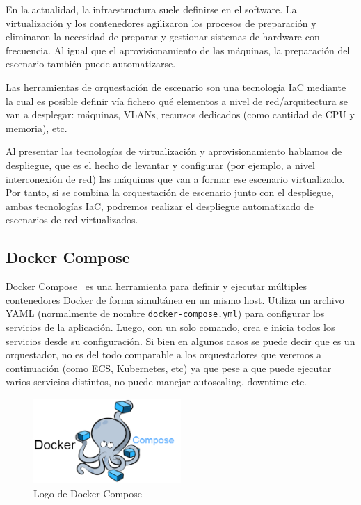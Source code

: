	En la actualidad, la infraestructura suele definirse en el software. La virtualización y los contenedores agilizaron los procesos de preparación y eliminaron la necesidad de preparar y gestionar sistemas de hardware con frecuencia. Al igual que el aprovisionamiento de las máquinas, la preparación del escenario también puede automatizarse.

	Las herramientas de orquestación de escenario son una tecnología IaC mediante la cual es posible definir vía fichero qué elementos a nivel de red/arquitectura se van a desplegar: máquinas, VLANs, recursos dedicados (como cantidad de CPU y memoria), etc. 

	Al presentar las tecnologías de virtualización y aprovisionamiento hablamos de despliegue, que es el hecho de levantar y configurar (por ejemplo, a nivel interconexión de red) las máquinas que van a formar ese escenario virtualizado. Por tanto, si se combina la orquestación de escenario junto con el despliegue, ambas tecnologías IaC, podremos realizar el despliegue automatizado de escenarios de red virtualizados.

\subsection{Docker Compose}
	Docker Compose~\cite{orq2} es una herramienta para definir y ejecutar múltiples contenedores Docker de forma simultánea en un mismo host. Utiliza un archivo YAML (normalmente de nombre \texttt{docker-compose.yml}) para configurar los servicios de la aplicación. Luego, con un solo comando, crea e inicia todos los servicios desde su configuración. Si bien en algunos casos se puede decir que es un orquestador, no es del todo comparable a los orquestadores que veremos a continuación (como ECS, Kubernetes, etc) ya que pese a que puede ejecutar varios servicios distintos, no puede manejar autoscaling, downtime etc.

	\begin{figure}[h]
	\centering
	\includegraphics[width=0.5\textwidth]{../imgs/EdA/compose.png}
	\caption{Logo de Docker Compose}
	\label{fig:compose}
	\end{figure}

